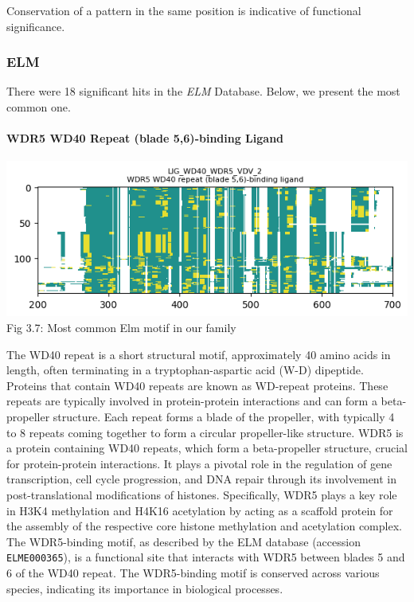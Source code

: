\documentclass[10pt,twocolumn,letterpaper]{article}
\begin{document}
Conservation of a pattern in the same position is indicative of functional significance.

\subsubsection{ELM}

There were 18 significant hits in the \textit{ELM} Database. Below, we present the most common one.

\paragraph{WDR5 WD40 Repeat (blade 5,6)-binding Ligand}

\begin{center}
    \includegraphics[scale=0.4]{report/img/Elm.png} \\
    \small{Fig 3.7: Most common Elm motif in our family}
\end{center}


The WD40 repeat is a short structural motif, approximately 40 amino acids in length, often terminating in a tryptophan-aspartic acid (W-D) dipeptide. Proteins that contain WD40 repeats are known as WD-repeat proteins. These repeats are typically involved in protein-protein interactions and can form a beta-propeller structure. Each repeat forms a blade of the propeller, with typically 4 to 8 repeats coming together to form a circular propeller-like structure.
WDR5 is a protein containing WD40 repeats, which form a beta-propeller structure, crucial for protein-protein interactions. It plays a pivotal role in the regulation of gene transcription, cell cycle progression, and DNA repair through its involvement in post-translational modifications of histones. Specifically, WDR5 plays a key role in H3K4 methylation and H4K16 acetylation by acting as a scaffold protein for the assembly of the respective core histone methylation and acetylation complex. The WDR5-binding motif, as described by the ELM database \cite{WDR5} (accession \texttt{ELME000365}), is a functional site that interacts with WDR5 between blades 5 and 6 of the WD40 repeat. The WDR5-binding motif is conserved across various species, indicating its importance in biological processes. \\
\end{document}
